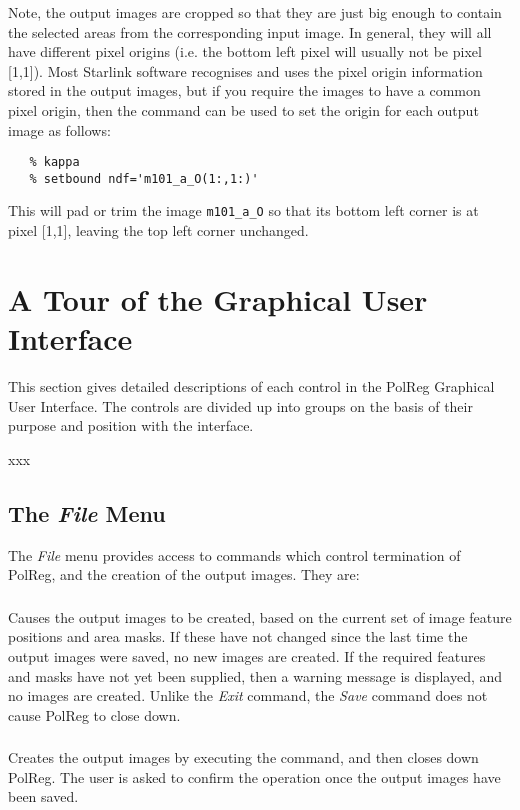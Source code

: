 Note, the output images are cropped so that they are just big enough to
contain the selected areas from the corresponding input image. In
general, they will all have different pixel origins (i.e. the bottom left
pixel will usually not be pixel [1,1]). Most Starlink software recognises
and uses the pixel origin information stored in the output images, but if
you require the images to have a common pixel origin, then the
 command 
can be used to set the origin for each output image as follows:

\begin{verbatim}
   % kappa
   % setbound ndf='m101_a_O(1:,1:)' 
\end{verbatim}

This will pad or trim the image {\tt m101\_a\_O} so that its bottom left 
corner is at pixel [1,1], leaving the top left corner unchanged.

\section {A Tour of the Graphical User Interface}
This section gives detailed descriptions of each control in the PolReg 
Graphical User Interface. The controls are divided up into groups on the
basis of their purpose and position with the interface.

xxx

\subsection {The {\em File} Menu}
The {\em File} menu provides access to commands which control
termination of PolReg, and the creation of the output images. They are:

\subsubsection {} Causes the output images to be
created, based on the current set of image feature positions and area masks. If
these have not changed since the last time the output images were saved,
no new images are created. If the required features and masks have not
yet been supplied, then a warning message is displayed, and no images are
created. Unlike the {\em Exit} command, the {\em Save} command does not
cause PolReg to close down.

\subsubsection {} Creates the output images by executing
the  command, and then closes down
PolReg. The user is asked to confirm the operation once the output images
have been saved.

